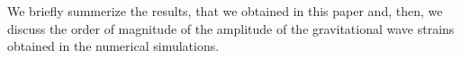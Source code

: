 We briefly summerize the results, that we obtained in this paper and, then, we discuss the order of magnitude of the amplitude of the gravitational wave strains obtained in the numerical simulations.
